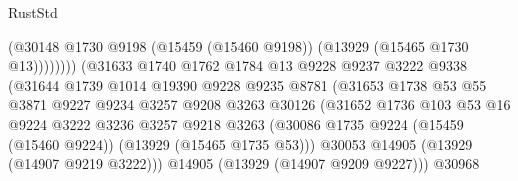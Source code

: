 \begin{lexlean}{RustStd}
\begin{coremodule}
                                            (@30148
                                              @1730
                                              @9198
                                              (@15459 (@15460 @9198))
                                              (@13929 (@15465 @1730 @13))))))))
                                  (@31633
                                    @1740
                                    @1762
                                    @1784
                                    @13
                                    @9228
                                    @9237
                                    @3222
                                    @9338
                                    (@31644
                                      @1739
                                      @1014
                                      @19390
                                      @9228
                                      @9235
                                      @8781
                                      (@31653
                                        @1738
                                        @53
                                        @55
                                        @3871
                                        @9227
                                        @9234
                                        @3257
                                        @9208
                                        @3263
                                        @30126
                                        (@31652
                                          @1736
                                          @103
                                          @53
                                          @16
                                          @9224
                                          @3222
                                          @3236
                                          @3257
                                          @9218
                                          @3263
                                          (@30086
                                            @1735
                                            @9224
                                            (@15459 (@15460 @9224))
                                            (@13929 (@15465 @1735 @53)))
                                          @30053
                                          @14905
                                          (@13929 (@14907 @9219 @3222)))
                                        @14905
                                        (@13929 (@14907 @9209 @9227)))
                                      @30968

\end{coremodule}
\end{lexlean}
